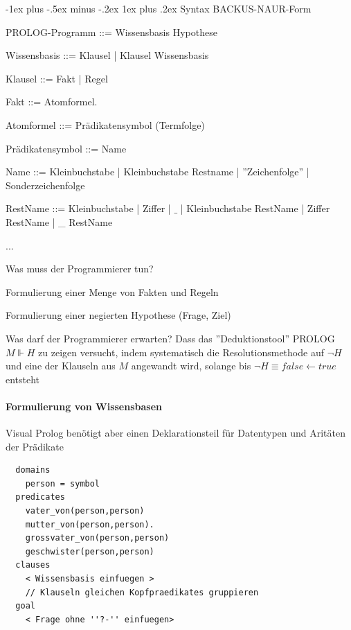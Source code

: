 \documentclass[a4paper]{article}
\makeatletter
\renewcommand{\subsubsection}{\@startsection{subsubsection}{3}{0mm}%
                {-1ex plus -.5ex minus -.2ex}%
                {1ex plus .2ex}%
                {\normalfont\small\bfseries}}
\makeatother
\begin{document}
\begin{multicols}{3}
  \subsubsection{Syntax}
  BACKUS-NAUR-Form
  \begin{itemize*}
    \item PROLOG-Programm ::= Wissensbasis Hypothese
    \item Wissensbasis ::= Klausel | Klausel Wissensbasis
    \item Klausel ::= Fakt | Regel
    \item Fakt ::= Atomformel.
    \item Atomformel ::= Prädikatensymbol (Termfolge)
    \item Prädikatensymbol ::= Name
    \item Name ::= Kleinbuchstabe | Kleinbuchstabe Restname | ''Zeichenfolge'' | Sonderzeichenfolge
    \item RestName ::= Kleinbuchstabe | Ziffer | $\_$ | Kleinbuchstabe RestName | Ziffer RestName | \_ RestName
    \item ...
  \end{itemize*}

  Was muss der Programmierer tun?
  \begin{itemize*}
    \item Formulierung einer Menge von Fakten und Regeln
    \item Formulierung einer negierten Hypothese (Frage, Ziel)
  \end{itemize*}

  Was darf der Programmierer erwarten? Dass das ''Deduktionstool'' PROLOG $M \Vdash H$ zu zeigen versucht, indem systematisch die Resolutionsmethode auf $\lnot H$ und eine der Klauseln aus $M$ angewandt wird, solange bis $\lnot H\equiv false\leftarrow true$ entsteht

  \paragraph{Formulierung von Wissensbasen}
  Visual Prolog benötigt aber einen Deklarationsteil für Datentypen und Aritäten der Prädikate
  \begin{lstlisting}
  domains
    person = symbol
  predicates
    vater_von(person,person)       
    mutter_von(person,person).     
    grossvater_von(person,person)   
    geschwister(person,person)      
  clauses
    < Wissensbasis einfuegen >
    // Klauseln gleichen Kopfpraedikates gruppieren
  goal
    < Frage ohne ''?-'' einfuegen>
  \end{lstlisting}


\end{multicols}
\end{document}
